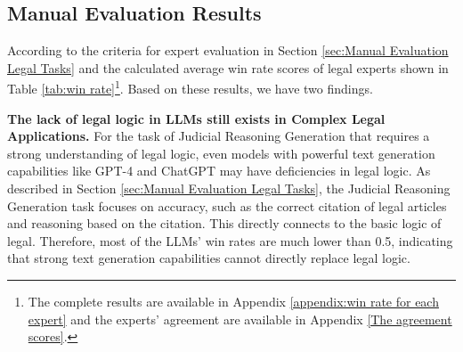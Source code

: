 \subsection{Manual Evaluation Results}
\begin{table}[!htb]
  \centering

\caption{The average win rate (WR) of LLMs for the Judicial Reasoning Generation and Legal Consultation tasks. The total score represents the score obtained by LLMs through automatic evaluation on our benchmark.}
  \label{tab:win rate}%
\end{table}%

According to the criteria for expert evaluation in Section \ref{sec:Manual Evaluation Legal Tasks} and the calculated average win rate scores of legal experts shown in Table \ref{tab:win rate}\footnote{The complete results are available in Appendix \ref{appendix:win rate for each expert} and the experts' agreement are available in Appendix \ref{The agreement scores}.}.
Based on these results, we have two findings.

\textbf{The lack of legal logic in LLMs still exists in Complex Legal Applications.}
For the task of Judicial Reasoning Generation that requires a strong understanding of legal logic, even models with powerful text generation capabilities like GPT-4 and ChatGPT may have deficiencies in legal logic. 
As described in Section \ref{sec:Manual Evaluation Legal Tasks}, the Judicial Reasoning Generation task focuses on accuracy, such as the correct citation of legal articles and reasoning based on the citation. This directly connects to the basic logic of legal.
Therefore, most of the LLMs' win rates are much lower than 0.5, indicating that strong text generation capabilities cannot directly replace legal logic.

